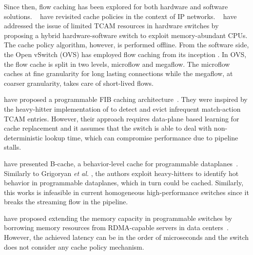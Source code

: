Since then, flow caching has been explored for both hardware and software solutions.
\citeauthor{Kim:09}~\cite{Kim:09} have revisited cache policies in the context of IP networks.
\citeauthor{Katta:2014}~\cite{Katta:2014,Katta:2016} have addressed the issue of limited TCAM resources in hardware switches by proposing a hybrid hardware-software switch to exploit memory-abundant CPUs.
The cache policy algorithm, however, is performed offline. 
From the software side, the Open vSwitch (OVS) has employed flow caching from its inception \cite{Pfaff:15}.
In OVS, the flow cache is split in two levels, microflow and megaflow.
The microflow caches at fine granularity for long lasting connections while the megaflow, at coarser granularity, takes care of short-lived flows.

\citeauthor{Grigoryan:18} have proposed a programmable FIB caching architecture~\cite{Grigoryan:18}. They were inspired by the heavy-hitter implementation of \cite{Sivaraman:17} to detect and evict infrequent match-action TCAM entries. However, their approach requires data-plane based learning for cache replacement and it assumes that the switch is able to deal with non-deterministic lookup time, which can compromise performance due to pipeline stalls. 

\citeauthor{Zhang:2018} have presented B-cache, a behavior-level cache for programmable dataplanes~\cite{Zhang:2018}. Similarly to Grigoryan \textit{et al.} \cite{Grigoryan:18}, the authors exploit heavy-hitters to identify hot behavior in programmable dataplanes, which in turn could be cached. Similarly, this works is infeasible in current homogeneous high-performance switches since it breaks the streaming flow in the pipeline.

\citeauthor{Kim:2018} have proposed extending the memory capacity in programmable switches by borrowing memory resources from RDMA-capable servers in data centers~\cite{Kim:2018}. However, the achieved latency can be in the order of microseconds and the switch does not consider any cache policy mechanism.

